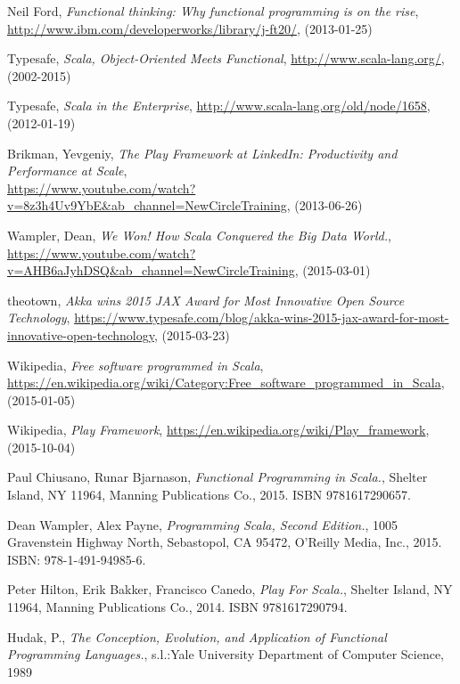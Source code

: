 \documentclass[12pt,twoside,a4paper]{report}
\begin{document}

\begin{thebibliography}{99}

Neil Ford,
\emph{Functional thinking: Why functional programming is on the rise},
\url{http://www.ibm.com/developerworks/library/j-ft20/},
(2013-01-25)

Typesafe,
\emph{Scala, Object-Oriented Meets Functional},
\url{http://www.scala-lang.org/},
(2002-2015)
	
Typesafe,
\emph{Scala in the Enterprise},
\url{http://www.scala-lang.org/old/node/1658},
(2012-01-19)

Brikman, Yevgeniy,
\emph{The Play Framework at LinkedIn: Productivity and Performance at Scale},\\
\url{https://www.youtube.com/watch?v=8z3h4Uv9YbE&ab_channel=NewCircleTraining},
(2013-06-26)

Wampler, Dean,
\emph{We Won! How Scala Conquered the Big Data World.},
\url{https://www.youtube.com/watch?v=AHB6aJyhDSQ&ab_channel=NewCircleTraining},
(2015-03-01)

theotown,
\emph{Akka wins 2015 JAX Award for Most Innovative Open Source Technology},
\url{https://www.typesafe.com/blog/akka-wins-2015-jax-award-for-most-innovative-open-technology},
(2015-03-23)
	
Wikipedia,
\emph{Free software programmed in Scala},
\url{https://en.wikipedia.org/wiki/Category:Free_software_programmed_in_Scala},
(2015-01-05)
	
Wikipedia,
\emph{Play Framework},
\url{https://en.wikipedia.org/wiki/Play_framework},
(2015-10-04)
	
Paul Chiusano,	Runar Bjarnason,
\emph{Functional Programming in Scala.},
Shelter Island, NY 11964,
Manning Publications Co., 2015. ISBN 9781617290657.

Dean Wampler, Alex Payne,
\emph{Programming Scala, Second Edition.},
1005 Gravenstein Highway North, Sebastopol, CA 95472,
O’Reilly Media, Inc., 2015. ISBN: 978-1-491-94985-6.
	
Peter Hilton, Erik Bakker, Francisco Canedo,
\emph{Play For Scala.},
Shelter Island, NY 11964,
Manning Publications Co., 2014. ISBN 9781617290794.

Hudak, P.,
\emph{The Conception, Evolution, and Application of Functional Programming Languages.},
s.l.:Yale University Department of Computer Science,
1989


\end{thebibliography}
\end{document}
